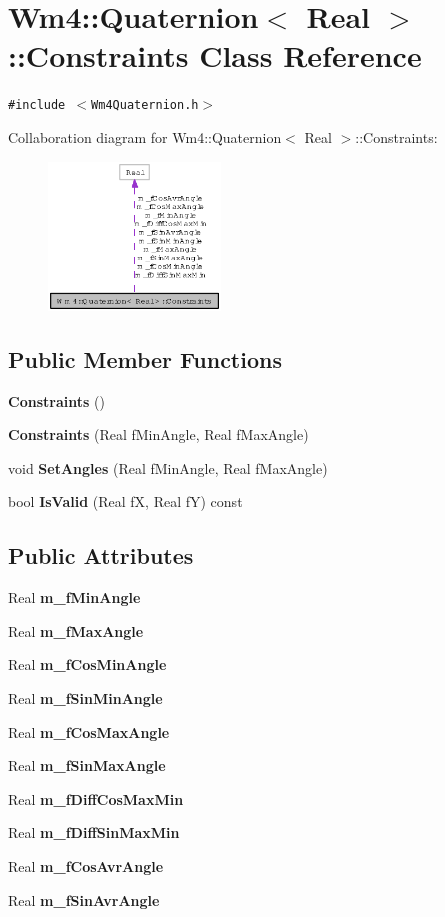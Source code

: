 \section{Wm4::Quaternion$<$ Real $>$::Constraints Class Reference}
\label{classWm4_1_1Quaternion_1_1Constraints}
{\tt \#include $<$Wm4Quaternion.h$>$}

Collaboration diagram for Wm4::Quaternion$<$ Real $>$::Constraints:\begin{figure}[H]
\begin{center}
\leavevmode
\includegraphics[width=130pt]{classWm4_1_1Quaternion_1_1Constraints__coll__graph}
\end{center}
\end{figure}
\subsection*{Public Member Functions}
\begin{CompactItemize}
\item 
{\bf Constraints} ()
\item 
{\bf Constraints} (Real f\-Min\-Angle, Real f\-Max\-Angle)
\item 
void {\bf Set\-Angles} (Real f\-Min\-Angle, Real f\-Max\-Angle)
\item 
bool {\bf Is\-Valid} (Real f\-X, Real f\-Y) const
\end{CompactItemize}
\subsection*{Public Attributes}
\begin{CompactItemize}
\item 
Real {\bf m\_\-f\-Min\-Angle}
\item 
Real {\bf m\_\-f\-Max\-Angle}
\item 
Real {\bf m\_\-f\-Cos\-Min\-Angle}
\item 
Real {\bf m\_\-f\-Sin\-Min\-Angle}
\item 
Real {\bf m\_\-f\-Cos\-Max\-Angle}
\item 
Real {\bf m\_\-f\-Sin\-Max\-Angle}
\item 
Real {\bf m\_\-f\-Diff\-Cos\-Max\-Min}
\item 
Real {\bf m\_\-f\-Diff\-Sin\-Max\-Min}
\item 
Real {\bf m\_\-f\-Cos\-Avr\-Angle}
\item 
Real {\bf m\_\-f\-Sin\-Avr\-Angle}
\end{CompactItemize}

